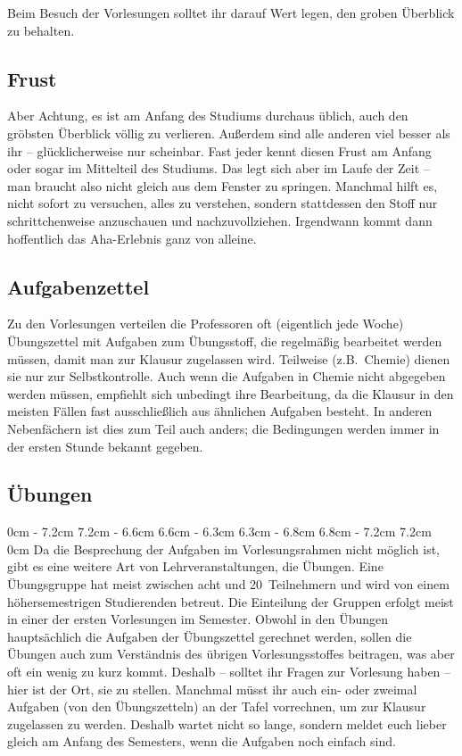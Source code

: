 \begin{multicols}{2}
Beim Besuch der Vorlesungen solltet ihr darauf Wert legen, den groben Überblick zu behalten.

\subsection*{Frust}
Aber Achtung, es ist am Anfang des Studiums durchaus üblich, auch den gröbsten Überblick völlig zu verlieren. Außerdem sind alle anderen viel besser als ihr -- glücklicherweise nur scheinbar. Fast jeder kennt diesen Frust am Anfang oder sogar im Mittelteil des Studiums. Das legt sich aber im Laufe der Zeit -- man braucht also nicht gleich aus dem Fenster zu springen. Manchmal hilft es, nicht sofort zu versuchen, alles zu verstehen, sondern stattdessen den Stoff nur schrittchenweise anzuschauen und nachzuvollziehen. Irgendwann kommt dann hoffentlich das Aha-Erlebnis ganz von alleine.

\subsection*{Aufgabenzettel}
Zu den Vorlesungen verteilen die Professoren oft (eigentlich jede Woche) Übungszettel mit Aufgaben zum Übungsstoff, die regelmäßig bearbeitet werden müssen, damit man zur Klausur zugelassen wird. Teilweise (z.B.\ Chemie) dienen sie nur zur Selbstkontrolle. Auch wenn die Aufgaben in Chemie nicht abgegeben werden müssen, empfiehlt sich unbedingt ihre Bearbeitung, da die Klausur in den meisten Fällen fast ausschließlich aus ähnlichen Aufgaben besteht. In anderen Nebenfächern ist dies zum Teil auch anders; die Bedingungen werden immer in der ersten Stunde bekannt gegeben.

\subsection*{Übungen}
0cm \columnwidth
0cm \columnwidth
0cm \columnwidth
0cm \columnwidth
0cm \columnwidth
0cm \columnwidth
0cm \columnwidth
0cm \columnwidth
0cm \columnwidth
\dimexpr\columnwidth - 7.2cm 7.2cm
\dimexpr\columnwidth - 6.6cm 6.6cm
\dimexpr\columnwidth - 6.3cm 6.3cm
\dimexpr\columnwidth - 6.8cm 6.8cm
\dimexpr\columnwidth - 7.2cm 7.2cm
0cm \columnwidth
Da die Besprechung der Aufgaben im Vorlesungsrahmen nicht möglich ist, gibt es eine weitere Art von Lehrveranstaltungen, die Übungen. Eine Übungsgruppe hat meist zwischen acht und 20~Teilnehmern und wird von einem höhersemestrigen Studierenden betreut. Die Einteilung der Gruppen erfolgt meist in einer der ersten Vorlesungen im Semester. Obwohl in den Übungen hauptsächlich die Aufgaben der Übungszettel gerechnet werden, sollen die Übungen auch zum Verständnis des übrigen Vorlesungsstoffes beitragen, was aber oft ein wenig zu kurz kommt.
\vspace{1.4cm}
Deshalb -- solltet ihr Fragen zur Vorlesung haben -- hier ist der Ort, sie zu stellen. Manchmal müsst ihr auch ein- oder zweimal Aufgaben (von den Übungszetteln) an der Tafel vorrechnen, um zur Klausur zugelassen zu werden. Deshalb wartet nicht so lange, sondern meldet euch lieber gleich am Anfang des Semesters, wenn die Aufgaben noch einfach sind.


\end{multicols}
